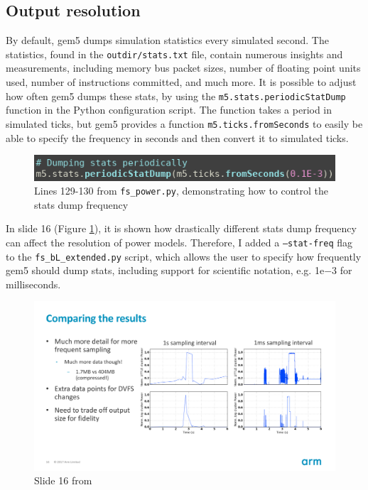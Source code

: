     \subsection{Output resolution}
    By default, gem5 dumps simulation statistics every simulated second. The 
    statistics, found in the \texttt{outdir/stats.txt} file, contain numerous 
    insights and measurements, including memory bus packet sizes, number of 
    floating point units used, number of instructions committed, and much more. 
    It is possible to adjust how often gem5 dumps these stats, by using the 
    \texttt{m5.stats.periodicStatDump} function in the Python configuration 
    script. The function takes a period in simulated ticks, but gem5 provides a 
    function \texttt{m5.ticks.fromSeconds} to easily be able to specify the 
    frequency in seconds and then convert it to simulated ticks.
    \begin{figure}[H]
        \centering
        \includegraphics[width=0.6\linewidth]{screenshots/config-exts/periodic-dump-stats.png}
        \caption{Lines 129-130 from \texttt{fs\_power.py}, demonstrating how to 
                 control the stats dump frequency}
    \end{figure}
    In \cite{bischoff_gem5_2017-1} slide 16 (Figure 
    \ref{fig:bischoff-gem5-s16}), it is shown how drastically different stats 
    dump frequency can affect the resolution of power models. Therefore, I 
    added a \texttt{--stat-freq} flag to the \texttt{fs\_bL\_extended.py} 
    script, which allows the user to specify how frequently gem5 should dump 
    stats, including support for scientific notation, e.g. {\sffamily 1e$-$3} 
    for milliseconds.
    \begin{figure}[H]
        \centering
        \includegraphics[width=0.9\linewidth]{screenshots/empowering-the-masses-s16.png}
        \caption{Slide 16 from \cite{bischoff_gem5_2017-1}}
        \label{fig:bischoff-gem5-s16}
    \end{figure}

